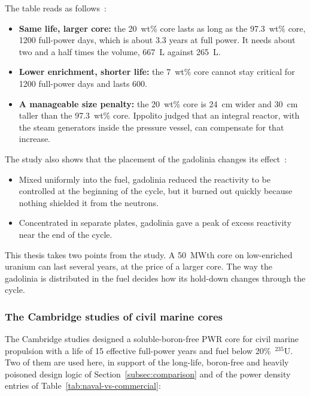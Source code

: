 The table reads as follows~\cite{ippolito_1990}:

\begin{itemize}
  \item \textbf{Same life, larger core:} the 20~wt\% core lasts as long as
        the 97.3~wt\% core, 1200 full-power days, which is about 3.3
        years at full power. It needs about two and a half times the
        volume, 667~L against 265~L.

  \item \textbf{Lower enrichment, shorter life:} the 7~wt\% core cannot
        stay critical for 1200 full-power days and lasts 600.

  \item \textbf{A manageable size penalty:} the 20~wt\% core is 24~cm wider
        and 30~cm taller than the 97.3~wt\% core. Ippolito judged that an
        integral reactor, with the steam generators inside the pressure
        vessel, can compensate for that increase.
\end{itemize}

The study also shows that the placement of the gadolinia changes its
effect~\cite{ippolito_1990}:

\begin{itemize}
  \item Mixed uniformly into the fuel, gadolinia reduced the reactivity
        to be controlled at the beginning of the cycle, but it burned out
        quickly because nothing shielded it from the neutrons.

  \item Concentrated in separate plates, gadolinia gave a peak of excess
        reactivity near the end of the cycle.
\end{itemize}

This thesis takes two points from the study. A 50~MWth core on
low-enriched uranium can last several years, at the price of a larger
core. The way the gadolinia is distributed in the fuel decides how its
hold-down changes through the cycle.

\subsubsection{The Cambridge studies of civil marine cores}
\label{subsec:academic-cambridge}

The Cambridge studies designed a soluble-boron-free PWR core for civil
marine propulsion with a life of 15 effective full-power years and fuel
below 20\%~$^{235}$U. Two of them are used here, in support of the
long-life, boron-free and heavily poisoned design logic of
Section~\ref{subsec:comparison} and of the power density entries of
Table~\ref{tab:naval-vs-commercial}:

